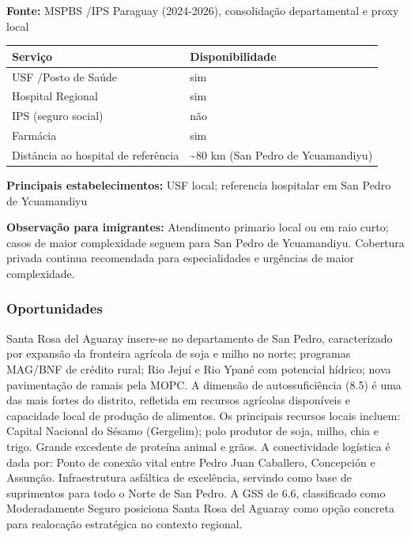 \textbf{Fonte:} MSPBS /\allowbreak  IPS Paraguay (2024-2026), consolidação
departamental e proxy local

{\def\LTcaptype{none} %
\begin{longtable}[]{@{}
  >{\raggedright\arraybackslash}p{}
  >{\raggedright\arraybackslash}p{}@{}}
\toprule\noalign{}
\begin{minipage}[b]{\linewidth}\raggedright
Serviço
\end{minipage} & \begin{minipage}[b]{\linewidth}\raggedright
Disponibilidade
\end{minipage} \\
\midrule\noalign{}
\endhead
\bottomrule\noalign{}
\endlastfoot
USF /\allowbreak  Posto de Saúde & sim \\
Hospital Regional & sim \\
IPS (seguro social) & não \\
Farmácia & sim \\
Distância ao hospital de referência & \textasciitilde80 km (San Pedro de
Ycuamandiyu) \\
\end{longtable}
}

\textbf{Principais estabelecimentos:} USF local; referencia hospitalar
em San Pedro de Ycuamandiyu

\textbf{Observação para imigrantes:} Atendimento primario local ou em
raio curto; casos de maior complexidade seguem para San Pedro de
Ycuamandiyu. Cobertura privada continua recomendada para especialidades
e urgências de maior complexidade.
\newpage

\subsubsection*{Oportunidades}\label{oport-santa-rosa-del-aguaray-0218}
Santa Rosa del Aguaray insere-se no departamento de San Pedro, caracterizado por expansão da fronteira agrícola de soja e milho no norte; programas MAG/BNF de crédito rural; Rio Jejuí e Rio Ypané com potencial hídrico; nova pavimentação de ramais pela MOPC. A dimensão de autossuficiência (8.5) é uma das mais fortes do distrito, refletida em recursos agrícolas disponíveis e capacidade local de produção de alimentos. Os principais recursos locais incluem: Capital Nacional do Sésamo (Gergelim); polo produtor de soja, milho, chia e trigo. Grande excedente de proteína animal e grãos. A conectividade logística é dada por: Ponto de conexão vital entre Pedro Juan Caballero, Concepción e Assunção. Infraestrutura asfáltica de excelência, servindo como base de suprimentos para todo o Norte de San Pedro. A GSS de 6.6, classificado como Moderadamente Seguro posiciona Santa Rosa del Aguaray como opção concreta para realocação estratégica no contexto regional.

